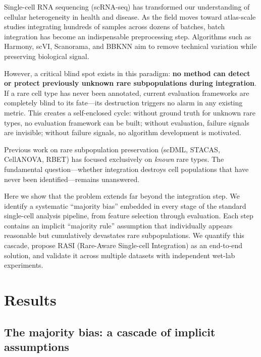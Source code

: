 \documentclass[10pt]{article}
\begin{document}
Single-cell RNA sequencing (scRNA-seq) has transformed our understanding of cellular heterogeneity in health and disease\cite{regev2017}. As the field moves toward atlas-scale studies integrating hundreds of samples across dozens of batches\cite{kang2024}, batch integration has become an indispensable preprocessing step. Algorithms such as Harmony\cite{korsunsky2019}, scVI\cite{lopez2018}, Scanorama\cite{hie2019}, and BBKNN\cite{polanski2020} aim to remove technical variation while preserving biological signal.

However, a critical blind spot exists in this paradigm: \textbf{no method can detect or protect previously unknown rare subpopulations during integration}. If a rare cell type has never been annotated, current evaluation frameworks are completely blind to its fate---its destruction triggers no alarm in any existing metric. This creates a self-enclosed cycle: without ground truth for unknown rare types, no evaluation framework can be built; without evaluation, failure signals are invisible; without failure signals, no algorithm development is motivated\cite{luecken2022}.

Previous work on rare subpopulation preservation (scDML\cite{scdml}, STACAS\cite{stacas}, CellANOVA\cite{cellanova}, RBET\cite{rbet}) has focused exclusively on \textit{known} rare types. The fundamental question---whether integration destroys cell populations that have never been identified---remains unanswered.

Here we show that the problem extends far beyond the integration step. We identify a systematic ``majority bias'' embedded in every stage of the standard single-cell analysis pipeline, from feature selection through evaluation. Each step contains an implicit ``majority rule'' assumption that individually appears reasonable but cumulatively devastates rare subpopulations. We quantify this cascade, propose RASI (Rare-Aware Single-cell Integration) as an end-to-end solution, and validate it across multiple datasets with independent wet-lab experiments.

\section{Results}

\subsection{The majority bias: a cascade of implicit assumptions}
\end{document}
